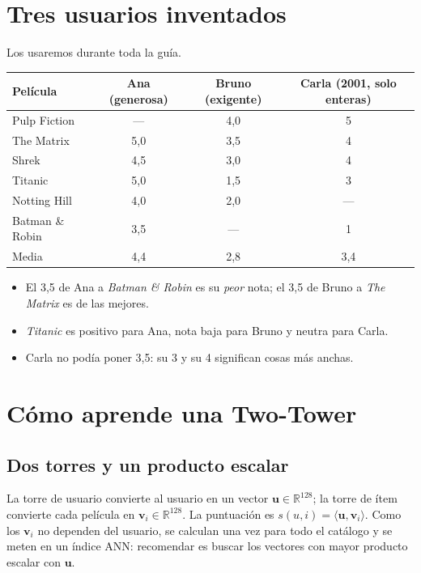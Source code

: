 \documentclass[a4paper,11pt]{article}
\begin{document}
\section{Tres usuarios inventados}\label{sec:ejemplo}
Los usaremos durante toda la guía.
\begin{center}
\begin{tabular}{lccc}
\toprule
Película & \textbf{Ana} (generosa) & \textbf{Bruno} (exigente) & \textbf{Carla} (2001, solo enteras) \\
\midrule
Pulp Fiction    & ---  & 4,0 & 5 \\
The Matrix      & 5,0  & 3,5 & 4 \\
Shrek           & 4,5  & 3,0 & 4 \\
Titanic         & 5,0  & 1,5 & 3 \\
Notting Hill    & 4,0  & 2,0 & --- \\
Batman \& Robin & 3,5  & --- & 1 \\
\midrule
Media           & 4,4  & 2,8 & 3,4 \\
\bottomrule
\end{tabular}
\end{center}
\begin{itemize}
  \item El 3,5 de Ana a \emph{Batman \& Robin} es su \emph{peor} nota; el 3,5 de Bruno a \emph{The Matrix} es de las mejores.
  \item \emph{Titanic} es positivo para Ana, nota baja para Bruno y neutra para Carla.
  \item Carla no podía poner 3,5: su 3 y su 4 significan cosas más anchas.
\end{itemize}

\section{Cómo aprende una Two-Tower}

\subsection{Dos torres y un producto escalar}
La torre de usuario convierte al usuario en un vector $\mathbf{u}\in\mathbb{R}^{128}$; la torre de ítem convierte cada
película en $\mathbf{v}_i\in\mathbb{R}^{128}$. La puntuación es $s(u,i)=\langle\mathbf{u},\mathbf{v}_i\rangle$.
Como los $\mathbf{v}_i$ no dependen del usuario, se calculan una vez para todo el catálogo y se meten en un índice ANN:
recomendar es buscar los vectores con mayor producto escalar con $\mathbf{u}$.
\end{document}
